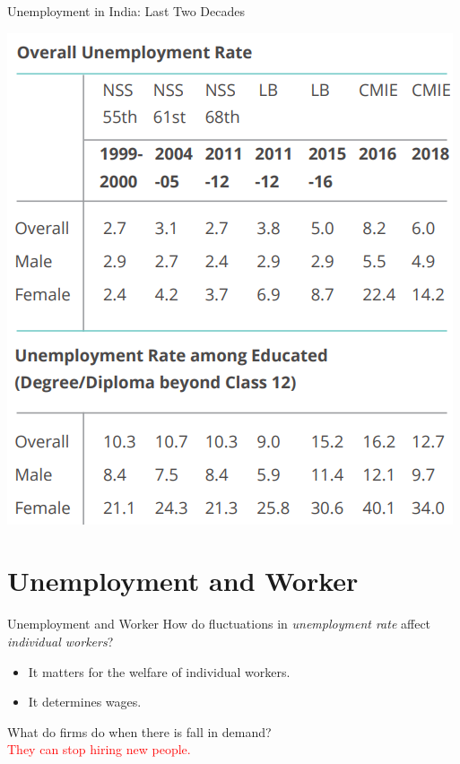 \documentclass[shownotes,11pt, aspectratio=169]{beamer}
\begin{document}
\begin{frame}{Unemployment in India: Last Two Decades}
\begin{center}
\includegraphics[scale=0.5]{graphs/L052019F02.png}
\end{center}
\end{frame}

\section{Unemployment and Worker}
\begin{frame}{Unemployment and Worker}
How do fluctuations in \textit{unemployment rate} affect \textit{individual workers}?
\begin{itemize}
\item It matters for the welfare of individual workers.
\item It determines \pause wages.
\end{itemize}
\pause
What do firms do when there is fall in demand? \pause
\\
\textcolor{red}{They can stop hiring new people.}
\end{frame}
\end{document}
